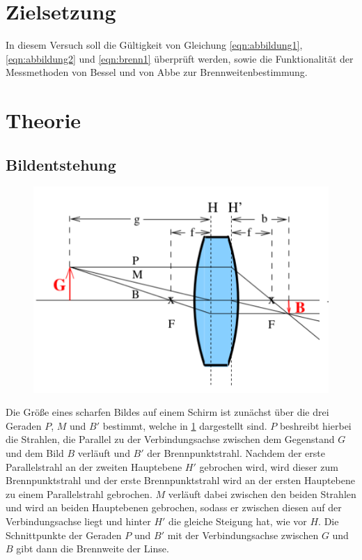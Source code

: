 \section{Zielsetzung}
In diesem Versuch soll die Gültigkeit von Gleichung \ref{eqn:abbildung1}, \ref{eqn:abbildung2} und \ref{eqn:brenn1} überprüft werden, sowie die Funktionalität der Messmethoden von Bessel und von Abbe zur Brennweitenbestimmung.


\section{Theorie}
\label{sec:Theorie}
\subsection{Bildentstehung}
    \begin{figure}
        \includegraphics[width=\textwidth]{Bilder/veranschaulichung.png}
        \centering
        \label{fig:veranschaulichung}
    \end{figure}

    \noindent Die Größe eines scharfen Bildes auf einem Schirm ist zunächst über die drei Geraden $P$, $M$ und $B'$ bestimmt, welche in \ref{fig:veranschaulichung} dargestellt sind. $P$ beshreibt hierbei die Strahlen, die Parallel zu der Verbindungsachse
    zwischen dem Gegenstand $G$ und dem Bild $B$ verläuft und $B'$ der Brennpunktstrahl. Nachdem der erste Parallelstrahl an der zweiten Hauptebene $H'$ gebrochen wird, wird dieser zum Brennpunktstrahl und der erste Brennpunktstrahl wird an der ersten
    Hauptebene zu einem Parallelstrahl gebrochen. $M$ verläuft dabei zwischen den beiden Strahlen und wird an beiden Hauptebenen gebrochen, sodass er zwischen diesen auf der Verbindungsachse liegt und hinter $H'$ die gleiche Steigung hat, wie vor $H$.
    Die Schnittpunkte der Geraden $P$ und $B'$ mit der Verbindungsachse zwischen $G$ und $B$ gibt dann die Brennweite der Linse.

